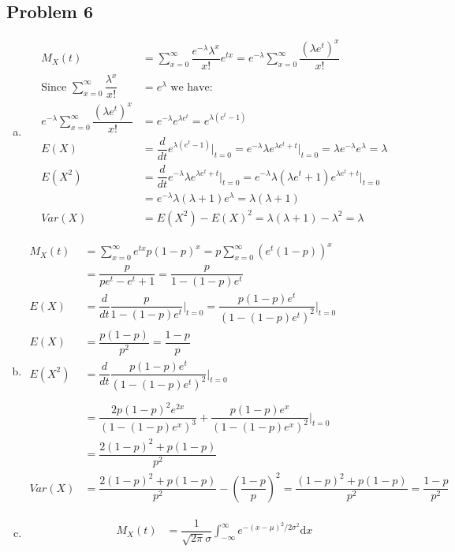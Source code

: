 \documentclass{article}
\newcommand{\dx}{\mathrm{d}x}
\begin{document}
\begin{flushleft}
\section*{Problem 6}
\begin{enumerate}[(a)]
\item
\begin{align*}
M_X(t)&=\sum_{x=0}^{\infty}\dfrac{e^{-\lambda}\lambda^x}{x!}e^{tx}=e^{-\lambda}\sum_{x=0}^{\infty}\dfrac{(\lambda e^t)^x}{x!}\\
\text{Since } \sum_{x=0}^{\infty}\dfrac{\lambda^x}{x!}&=e^{\lambda} \text{ we have:}\\
e^{-\lambda}\sum_{x=0}^{\infty}\dfrac{(\lambda e^t)^x}{x!}&=e^{-\lambda}e^{\lambda e^t}=e^{\lambda(e^t-1)}\\
E(X)&=\dfrac{d}{dt}e^{\lambda(e^t-1)}\bigg|_{t=0}=e^{-\lambda}\lambda e^{\lambda e^t+t}\bigg|_{t=0}=\lambda e^{-\lambda}e^{\lambda}=\lambda\\
E(X^2)&=\dfrac{d}{dt} e^{-\lambda}\lambda e^{\lambda e^t+t}\bigg|_{t=0}=e^{-\lambda}\lambda(\lambda e^t +1) e^{\lambda e^t+t}\bigg|_{t=0}\\
&=e^{-\lambda}\lambda (\lambda+1) e^{\lambda}=\lambda(\lambda+1)\\
Var(X)&=E(X^2)-E(X)^2=\lambda(\lambda+1)-\lambda^2=\lambda
\end{align*}
\item
\begin{align*}
M_X(t)&=\sum_{x=0}^{\infty}e^{tx}p(1-p)^x=p \sum_{x=0}^{\infty}(e^t(1-p))^x\\
&=\dfrac{p}{pe^t-e^t+1}=\dfrac{p}{1-(1-p)e^t}\\
E(X)&=\dfrac{d}{dt}\dfrac{p}{1-(1-p)e^t}\bigg|_{t=0}=\dfrac{p(1-p)e^t}{(1-(1-p)e^t)^2}\bigg|_{t=0}\\
E(X)&=\dfrac{p(1-p)}{p^2}=\dfrac{1-p}{p}\\
E(X^2)&=\dfrac{d}{dt}\dfrac{p(1-p)e^t}{(1-(1-p)e^t)^2}\bigg|_{t=0}\\ \\
&=\dfrac{2p(1-p)^2e^{2x}}{(1-(1-p)e^x)^3}+\dfrac{p(1-p)e^x}{(1-(1-p)e^x)^2}\bigg|_{t=0}\\
&=\dfrac{2(1-p)^2+p(1-p)}{p^2}\\
Var(X)&=\dfrac{2(1-p)^2+p(1-p)}{p^2}-(\dfrac{1-p}{p})^2=\dfrac{(1-p)^2+p(1-p)}{p^2}=\dfrac{1-p}{p^2}
\end{align*}
\item
\begin{align*}
M_X(t)&=\dfrac{1}{\sqrt{2\pi}\sigma}\int_{-\infty}^{\infty}e^{-(x-\mu)^2/2\sigma^2}\dx\\

\end{align*}
\end{enumerate}
\end{flushleft}
\end{document}
